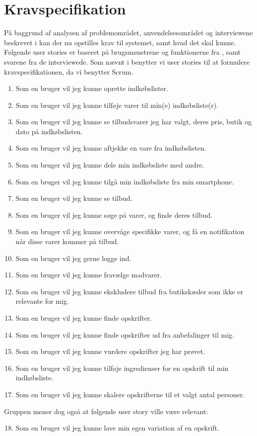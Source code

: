 \section{Kravspecifikation}\label{sec:krav}

På baggrund af analysen af problemområdet, anvendelsesområdet og interviewene beskrevet i   kan der nu opstilles krav til systemet, samt hvad det skal kunne.
Følgende user stories er baseret på brugsmønstrene og funktionerne fra , samt svarene fra de interviewede.
Som nævnt i  benytter vi user stories til at formulere kravspecifikationen, da vi benytter Scrum.

\begin{enumerate}
	\item Som en bruger vil jeg kunne oprette indkøbslister.
	\item Som en bruger vil jeg kunne tilføje varer til min(e) indkøbsliste(r).
	\item Som en bruger vil jeg kunne se tilbudsvarer jeg har valgt, deres pris, butik og dato på indkøbslisten.
	\item Som en bruger vil jeg kunne aftjekke en vare fra indkøbslisten.
	\item Som en bruger vil jeg kunne dele min indkøbsliste med andre.
	\item Som en bruger vil jeg kunne tilgå min indkøbsliste fra min smartphone.
			
	\item Som en bruger vil jeg kunne se tilbud.
	\item Som en bruger vil jeg kunne søge på varer, og finde deres tilbud. 
	
	\item Som en bruger vil jeg kunne overvåge specifikke varer, og få en notifikation når disse varer kommer på tilbud.
	
	\item Som en bruger vil jeg gerne logge ind.
	\item Som en bruger vil jeg kunne fravælge madvarer.
	\item Som en bruger vil jeg kunne ekskludere tilbud fra butikskæder som ikke er relevante for mig.
	
	\item Som en bruger vil jeg kunne finde opskrifter.
	\item Som en bruger vil jeg kunne finde opskrifter ud fra anbefalinger til mig.
	\item Som en bruger vil jeg kunne vurdere opskrifter jeg har prøvet.
	\item Som en bruger vil jeg kunne tilføje ingredienser for en opskrift til min indkøbsliste.
	\item Som en bruger vil jeg kunne skalere opskrifterne til et valgt antal personer.
\end{enumerate}
Gruppen mener dog også at følgende user story ville være relevant: 
\begin{enumerate}
\setcounter{enumi}{17}
	\item Som en bruger vil jeg kunne lave min egen variation af en opskrift.
\end{enumerate}

